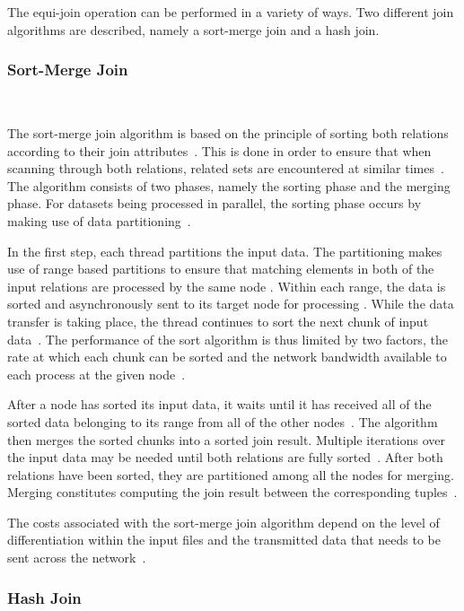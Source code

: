 \documentclass[11pt,twocolumn]{witseiepaper}
\begin{document}
The equi-join operation can be performed in a variety of ways. Two different join algorithms are described, namely a sort-merge join and a hash join.

\subsubsection{Sort-Merge Join}\label{sortmerge}$   $

The sort-merge join algorithm is based on the principle of sorting both relations according to their join attributes~\cite{thomas_zurek_optimisation_1997}. This is done in order to ensure that when scanning through both relations, related sets are encountered at similar times~\cite{thomas_zurek_optimisation_1997}. The algorithm consists of two phases, namely the sorting phase and the merging phase. For datasets being processed in parallel, the sorting phase occurs by making use of data partitioning~\cite{dist}.

In the first step, each thread partitions the input data. The partitioning makes use of range based partitions to ensure that matching elements in both of the input relations are processed by the same node \cite{dist}. Within each range, the data is sorted and asynchronously sent to its target node for processing \cite{dist}. While the data transfer is taking place, the thread continues to sort the next chunk of input data~\cite{dist}. The performance of the sort algorithm is thus limited by two factors, the rate at which each chunk can be sorted and the network bandwidth available to each process at the given node~\cite{dist}.

After a node has sorted its input data, it waits until it has received all of the sorted data belonging to its range from all of the other nodes~\cite{dist}. The algorithm then merges the sorted chunks into a sorted join result. Multiple iterations over the input data may be needed until both relations are fully sorted~\cite{dist}. After both relations have been sorted, they are partitioned among all the nodes for merging. Merging constitutes computing the join result between the corresponding tuples~\cite{dist}.

The costs associated with the sort-merge join algorithm depend on the level of differentiation within the input files and the transmitted data that needs to be sent across the network~\cite{dist}.

\subsubsection{Hash Join}$    $
\end{document}
